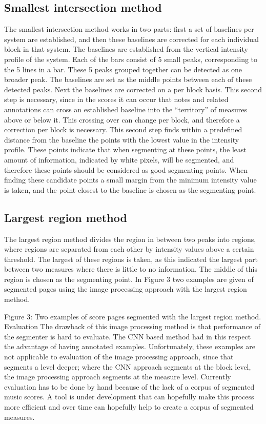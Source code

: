 \subsection{Smallest intersection method}
The smallest intersection method works in two parts: first a set of baselines per system are established, and then these baselines are corrected for each individual block in that system. The baselines are established from the vertical intensity profile of the system. Each of the bars consist of 5 small peaks, corresponding to the 5 lines in a bar. These 5 peaks grouped together can be detected as one broader peak. The baselines are set as the middle points between each of these detected peaks. Next the baselines are corrected on a per block basis. This second step is necessary, since in the scores it can occur that notes and related annotations can cross an established baseline into the “territory” of measures above or below it. This crossing over can change per block, and therefore a correction per block is necessary. This second step finds within a predefined distance from the baseline the points with the lowest value in the intensity profile. These points indicate that when segmenting at these points, the least amount of information, indicated by white pixels, will be segmented, and therefore these points should be considered as good segmenting points. When finding these candidate points a small margin from the minimum intensity value is taken, and the point closest to the baseline is chosen as the segmenting point.

\subsection{Largest region method}
The largest region method divides the region in between two peaks into regions, where regions are separated from each other by intensity values above a certain threshold. The largest of these regions is taken, as this indicated the largest part between two measures where there is little to no information. The middle of this region is chosen as the segmenting point. In Figure 3 two examples are given of segmented pages using the image processing approach with the largest region method.

Figure 3: Two examples of score pages segmented with the largest region method.    
Evaluation
The drawback of this image processing method is that performance of the segmenter is hard to evaluate. The CNN based method had in this respect the advantage of having annotated examples. Unfortunately, these examples are not applicable to evaluation of the image processing approach, since that segments a level deeper; where the CNN approach segments at the block level, the image processing approach segments at the measure level. Currently evaluation has to be done by hand because of the lack of a corpus of segmented music scores. A tool is under development that can hopefully make this process more efficient and over time can hopefully help to create a corpus of segmented measures.

